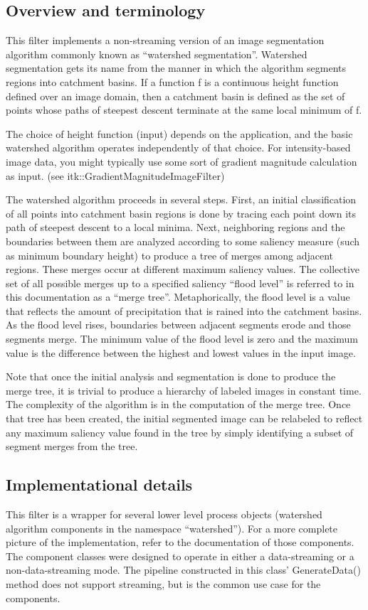 \documentclass{article}
\begin{document}
\subsection{Overview and terminology}
This filter implements a non-streaming version of an image segmentation algorithm commonly known as ``watershed segmentation''. Watershed segmentation gets its name from the manner in which the algorithm segments regions into catchment basins. If a function f is a continuous height function defined over an image domain, then a catchment basin is defined as the set of points whose paths of steepest descent terminate at the same local minimum of f.


The choice of height function (input) depends on the application, and the basic watershed algorithm operates independently of that choice. For intensity-based image data, you might typically use some sort of gradient magnitude calculation as input. (see itk::GradientMagnitudeImageFilter)


The watershed algorithm proceeds in several steps. First, an initial classification of all points into catchment basin regions is done by tracing each point down its path of steepest descent to a local minima. Next, neighboring regions and the boundaries between them are analyzed according to some saliency measure (such as minimum boundary height) to produce a tree of merges among adjacent regions. These merges occur at different maximum saliency values. The collective set of all possible merges up to a specified saliency ``flood level'' is referred to in this documentation as a ``merge tree''. Metaphorically, the flood level is a value that reflects the amount of precipitation that is rained into the catchment basins. As the flood level rises, boundaries between adjacent segments erode and those segments merge. The minimum value of the flood level is zero and the maximum value is the difference between the highest and lowest values in the input image.


Note that once the initial analysis and segmentation is done to produce the merge tree, it is trivial to produce a hierarchy of labeled images in constant time. The complexity of the algorithm is in the computation of the merge tree. Once that tree has been created, the initial segmented image can be relabeled to reflect any maximum saliency value found in the tree by simply identifying a subset of segment merges from the tree.

\subsection{Implementational details}
This filter is a wrapper for several lower level process objects (watershed algorithm components in the namespace ``watershed''). For a more complete picture of the implementation, refer to the documentation of those components. The component classes were designed to operate in either a data-streaming or a non-data-streaming mode. The pipeline constructed in this class' GenerateData() method does not support streaming, but is the common use case for the components.
\end{document}

